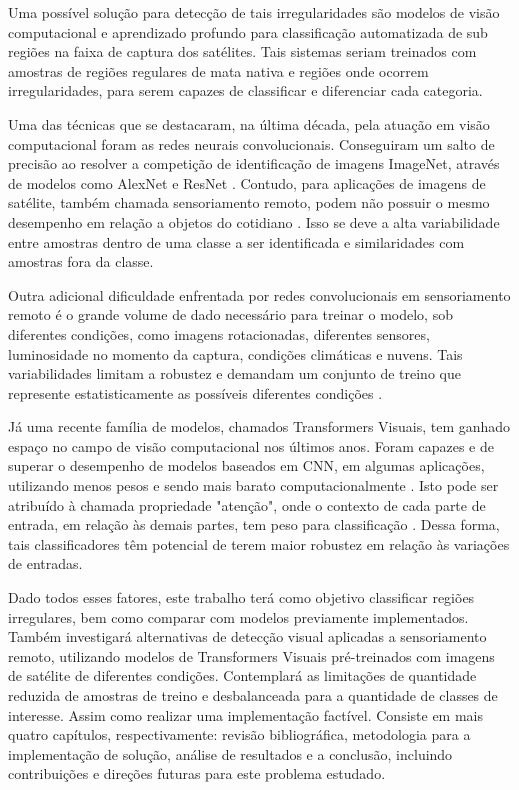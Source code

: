 Uma possível solução para detecção de tais irregularidades são modelos de visão computacional e aprendizado profundo para classificação automatizada de sub regiões na faixa de captura dos satélites. Tais sistemas seriam treinados com amostras de regiões regulares de mata nativa e regiões onde ocorrem irregularidades, para serem capazes de classificar e diferenciar cada categoria.

Uma das técnicas que se destacaram, na última década, pela atuação em visão computacional foram as redes neurais convolucionais. Conseguiram um salto de precisão ao resolver a competição de identificação de imagens ImageNet, através de modelos como AlexNet e ResNet \cite{alom2018history}. Contudo, para aplicações de imagens de satélite, também chamada sensoriamento remoto, podem não possuir o mesmo desempenho em relação a objetos do cotidiano \cite{wang2022empirical}. Isso se deve a alta variabilidade entre amostras dentro de uma classe a ser identificada e similaridades com amostras fora da classe.

Outra adicional dificuldade enfrentada por redes convolucionais em sensoriamento remoto é o grande volume de dado necessário para treinar o modelo, sob diferentes condições, como imagens rotacionadas, diferentes sensores, luminosidade no momento da captura, condições climáticas e nuvens. Tais variabilidades limitam a robustez e demandam um conjunto de treino que represente estatisticamente as possíveis diferentes condições \cite{5782957}.

Já uma recente família de modelos, chamados Transformers Visuais, tem ganhado espaço no campo de visão computacional nos últimos anos. Foram capazes e de superar o desempenho de modelos baseados em CNN, em algumas aplicações, utilizando menos pesos e sendo mais barato computacionalmente \cite{wang2022empirical}. Isto pode ser atribuído à chamada propriedade "atenção", onde o contexto de cada parte de entrada, em relação às demais partes, tem peso para classificação \cite{dosovitskiy2020image}. Dessa forma, tais classificadores têm potencial de terem maior robustez em relação às variações de entradas.


Dado todos esses fatores, este trabalho terá como objetivo classificar regiões irregulares, bem como comparar com modelos previamente implementados. Também investigará alternativas de detecção visual aplicadas a sensoriamento remoto, utilizando modelos de Transformers Visuais pré-treinados com imagens de satélite de diferentes condições. Contemplará as limitações de quantidade reduzida de amostras de treino e desbalanceada para a quantidade de classes de interesse. Assim como realizar uma implementação factível. Consiste em mais quatro capítulos, respectivamente: revisão bibliográfica, metodologia para a implementação de solução, análise de resultados e a conclusão, incluindo contribuições e direções futuras para este problema estudado.




